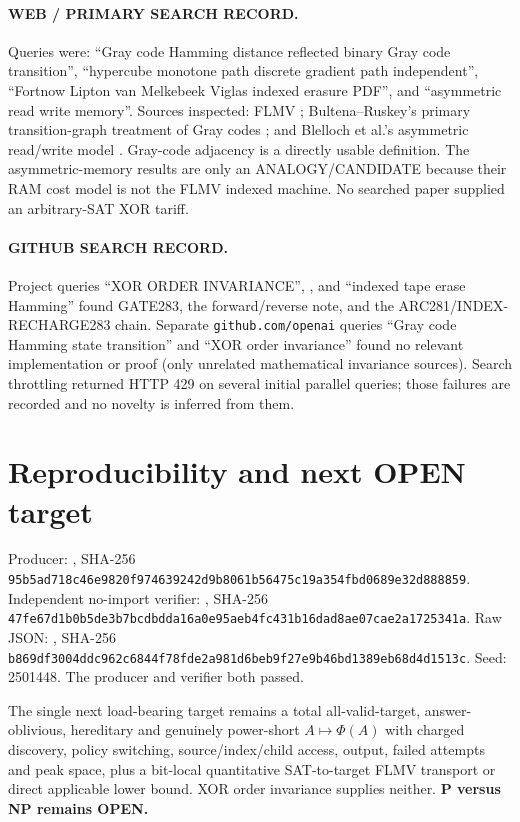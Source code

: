 \documentclass[11pt]{article}
\begin{document}
\paragraph{WEB / PRIMARY SEARCH RECORD.}
Queries were: ``Gray code Hamming distance reflected binary Gray code transition'',
``hypercube monotone path discrete gradient path independent'', ``Fortnow Lipton van
Melkebeek Viglas indexed erasure PDF'', and ``asymmetric read write memory''.  Sources
inspected: FLMV \cite{FLMV}; Bultena--Ruskey's primary transition-graph treatment of
Gray codes \cite{BR}; and Blelloch et al.'s asymmetric read/write model \cite{ARAM}.
Gray-code adjacency is a directly usable definition.  The asymmetric-memory results are
only an ANALOGY/CANDIDATE because their RAM cost model is not the FLMV indexed machine.
No searched paper supplied an arbitrary-SAT XOR tariff.

\paragraph{GITHUB SEARCH RECORD.}
Project queries ``XOR ORDER INVARIANCE'', , and
``indexed tape erase Hamming'' found GATE283, the forward/reverse note, and the
ARC281/INDEX-RECHARGE283 chain.  Separate \texttt{github.com/openai} queries ``Gray code
Hamming state transition'' and ``XOR order invariance'' found no relevant implementation
or proof (only unrelated mathematical invariance sources).  Search throttling returned
HTTP 429 on several initial parallel queries; those failures are recorded and no novelty
is inferred from them.

\section{Reproducibility and next OPEN target}
Producer:
, SHA-256
\texttt{95b5ad718c46e9820f974639242d9b8061b56475c19a354fbd0689e32d888859}.
Independent no-import verifier:
, SHA-256
\texttt{47fe67d1b0b5de3b7bcdbdda16a0e95aeb4fc431b16dad8ae07cae2a1725341a}.
Raw JSON:
,
SHA-256 \texttt{b869df3004ddc962c6844f78fde2a981d6beb9f27e9b46bd1389eb68d4d1513c}.
Seed: 2501448.  The producer and verifier both passed.

The single next load-bearing target remains a total all-valid-target, answer-oblivious,
hereditary and genuinely power-short $A\mapsto\Phi(A)$ with charged discovery, policy
switching, source/index/child access, output, failed attempts and peak space, plus a
bit-local quantitative SAT-to-target FLMV transport or direct applicable lower bound.
XOR order invariance supplies neither.  \textbf{P versus NP remains OPEN.}
\end{document}
